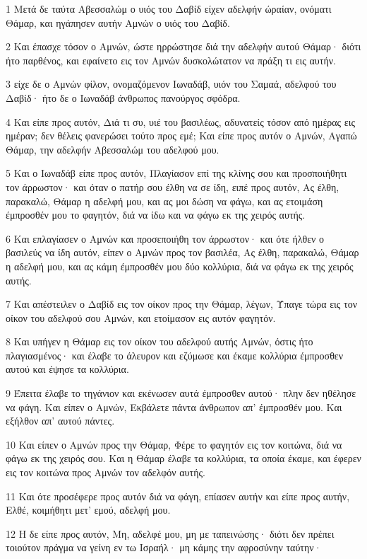 \par 1 Μετά δε ταύτα Αβεσσαλώμ ο υιός του Δαβίδ είχεν αδελφήν ώραίαν, ονόματι Θάμαρ, και ηγάπησεν αυτήν Αμνών ο υιός του Δαβίδ.
\par 2 Και έπασχε τόσον ο Αμνών, ώστε ηρρώστησε διά την αδελφήν αυτού Θάμαρ· διότι ήτο παρθένος, και εφαίνετο εις τον Αμνών δυσκολώτατον να πράξη τι εις αυτήν.
\par 3 είχε δε ο Αμνών φίλον, ονομαζόμενον Ιωναδάβ, υιόν του Σαμαά, αδελφού του Δαβίδ· ήτο δε ο Ιωναδάβ άνθρωπος πανούργος σφόδρα.
\par 4 Και είπε προς αυτόν, Διά τι συ, υιέ του βασιλέως, αδυνατείς τόσον από ημέρας εις ημέραν; δεν θέλεις φανερώσει τούτο προς εμέ; Και είπε προς αυτόν ο Αμνών, Αγαπώ Θάμαρ, την αδελφήν Αβεσσαλώμ του αδελφού μου.
\par 5 Και ο Ιωναδάβ είπε προς αυτόν, Πλαγίασον επί της κλίνης σου και προσποιήθητι τον άρρωστον· και όταν ο πατήρ σου έλθη να σε ίδη, ειπέ προς αυτόν, Ας έλθη, παρακαλώ, Θάμαρ η αδελφή μου, και ας μοι δώση να φάγω, και ας ετοιμάση έμπροσθέν μου το φαγητόν, διά να ίδω και να φάγω εκ της χειρός αυτής.
\par 6 Και επλαγίασεν ο Αμνών και προσεποιήθη τον άρρωστον· και ότε ήλθεν ο βασιλεύς να ίδη αυτόν, είπεν ο Αμνών προς τον βασιλέα, Ας έλθη, παρακαλώ, Θάμαρ η αδελφή μου, και ας κάμη έμπροσθέν μου δύο κολλύρια, διά να φάγω εκ της χειρός αυτής.
\par 7 Και απέστειλεν ο Δαβίδ εις τον οίκον προς την Θάμαρ, λέγων, Ύπαγε τώρα εις τον οίκον του αδελφού σου Αμνών, και ετοίμασον εις αυτόν φαγητόν.
\par 8 Και υπήγεν η Θάμαρ εις τον οίκον του αδελφού αυτής Αμνών, όστις ήτο πλαγιασμένος· και έλαβε το άλευρον και εζύμωσε και έκαμε κολλύρια έμπροσθεν αυτού και έψησε τα κολλύρια.
\par 9 Έπειτα έλαβε το τηγάνιον και εκένωσεν αυτά έμπροσθεν αυτού· πλην δεν ηθέλησε να φάγη. Και είπεν ο Αμνών, Εκβάλετε πάντα άνθρωπον απ' έμπροσθέν μου. Και εξήλθον απ' αυτού πάντες.
\par 10 Και είπεν ο Αμνών προς την Θάμαρ, Φέρε το φαγητόν εις τον κοιτώνα, διά να φάγω εκ της χειρός σου. Και η Θάμαρ έλαβε τα κολλύρια, τα οποία έκαμε, και έφερεν εις τον κοιτώνα προς Αμνών τον αδελφόν αυτής.
\par 11 Και ότε προσέφερε προς αυτόν διά να φάγη, επίασεν αυτήν και είπε προς αυτήν, Ελθέ, κοιμήθητι μετ' εμού, αδελφή μου.
\par 12 Η δε είπε προς αυτόν, Μη, αδελφέ μου, μη με ταπεινώσης· διότι δεν πρέπει τοιούτον πράγμα να γείνη εν τω Ισραήλ· μη κάμης την αφροσύνην ταύτην·

